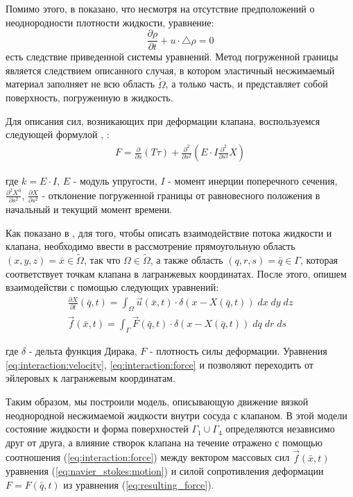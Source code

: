Помимо этого, в \cite{peskin2002immersed} показано, что несмотря на отсутствие
предположений о неоднородности плотности жидкости, уравнение:
\begin{equation}
    \frac{\partial \rho}{\partial t} + u \cdot \triangle \rho = 0
\end{equation}
есть следствие приведенной системы уравнений. Метод погруженной границы
является следствием описанного случая, в котором эластичный несжимаемый
материал заполняет не всю область $\tilde{\Omega}$, а только часть, и
представляет собой поверхность, погруженную в жидкость.


Для описания сил, возникающих при деформации клапана, воспользуемся следующей
формулой \cite{peskin2002immersed}, \cite{griffith2012immersed}:
\begin{gather}
    \label{eq:resulting_force}
    F = \frac{\partial}{\partial s} (T \tau) + \frac{\partial^2}{\partial s^2} (E \cdot I \frac{\partial^2}{\partial s^2} X)
\end{gather}

где \(k = E \cdot I\), \(E\) - модуль упругости, \(I\) - момент инерции
поперечного сечения, \(\frac{\partial^2 X^0}{\partial s^2}\), \(\frac{\partial
        X}{\partial s^2}\) - отклонение погруженной границы от равновесного
положения в начальный и текущий момент времени.

Как показано в \cite{peskin2002immersed}, для того, чтобы описать
взаимодействие потока жидкости и клапана, необходимо ввести в рассмотрение
прямоугольную область \((x, y, z) = \bar{x} \in \tilde{\Omega}\), так что
\(\Omega \in \tilde{\Omega}\), а также область \((q, r, s) = \bar{q} \in
    \Gamma\), которая соответствует точкам клапана в лагранжевых координатах.
После этого, опишем взаимодействи с помощью следующих уравнений:
\begin{gather}
    \label{eq:interaction:velocity}
    \frac{\partial X}{\partial t}(\bar{q}, t) = \int_{\Omega} \vec{u}(\bar{x}, t) \cdot \delta (x - X(\bar{q}, t))\; dx\; dy\; dz\\
    \label{eq:interaction:force}
    \vec{f}(\bar{x}, t) = \int_{\Gamma} \vec{F}(\bar{q}, t) \cdot \delta (x - X(\bar{q}, t))\; dq\; dr\; ds
\end{gather}

где \(\delta\) - дельта функция Дирака, \(F\) - плотность силы деформации.
Уравнения \ref{eq:interaction:velocity}, \ref{eq:interaction:force} и позволяют
переходить от эйлеровых к лагранжевым координатам.

Таким образом, мы построили модель, описывающую движение вязкой неоднородной
несжимаемой жидкости внутри сосуда с клапаном. В этой модели состояние жидкости
и форма поверхностей \(\Gamma_1 \cup \Gamma_4\) определяются независимо друг от
друга, а влияние створок клапана на течение отражено с помощью соотношения
(\ref{eq:interaction:force}) между вектором массовых сил \(\vec{f}(\bar{x},
    t)\) уравнения (\ref{eq:navier_stokes:motion}) и силой сопротивления
деформации \(F=F(\bar{q}, t)\) из уравнения (\ref{eq:resulting_force}).

